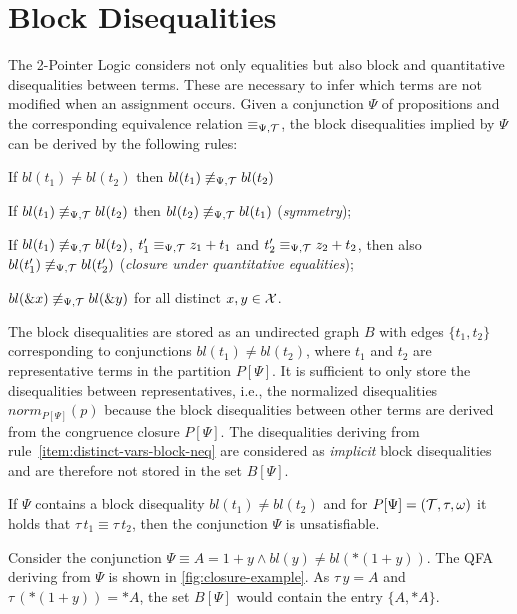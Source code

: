 \section{Block Disequalities}\label{section:block-disequalities}

The 2-Pointer Logic considers not only equalities but also block and quantitative disequalities between terms.
These are necessary to infer which terms are not
modified when an assignment occurs.
Given a conjunction $\Psi$ of propositions and the corresponding equivalence relation $\equiv_{\Psi,\mathcal{T}}$, the block disequalities implied by $\Psi$ can be derived by the following rules:\cite{new-paper-todo}

\begin{enumerate}[label={[B\arabic*]}, ref={[B\arabic*]}]
    \setcounter{enumi}{-1} %
    \item If $bl(t_1)\neq bl(t_2)$ then $bl(t_1)\not\equiv_{\Psi,\mathcal{T}} bl(t_2)$
    \item If $bl(t_1)\not\equiv_{\Psi,\mathcal{T}} bl(t_2)$ then $bl(t_2)\not\equiv_{\Psi,\mathcal{T}} bl(t_1)$
          (\emph{symmetry});
          \item\label{item:closure-under-quantitative-equalities}
          If $bl(t_1)\not\equiv_{\Psi,\mathcal{T}} bl(t_2)$, $t'_1 \equiv_{\Psi,\mathcal{T}} z_1+t_1$ and $t'_2\equiv_{\Psi,\mathcal{T}} z_2+t_2$, then
          also $bl(t'_1)\not\equiv_{\Psi,\mathcal{T}} bl(t'_2)$ (\emph{closure under quantitative equalities});
          \item\label{item:distinct-vars-block-neq} $bl(\&x) \not\equiv_{\Psi,\mathcal{T}} bl(\&y)$ for all distinct $x, y \in \mathcal{X}$.
\end{enumerate}

The block disequalities are stored as an undirected graph $B$
with edges $\{t_1,t_2\}$ corresponding to conjunctions $bl(t_1) \neq bl(t_2)$,
where $t_1$ and $t_2$ are representative terms in the partition $P[\Psi]$.
It is sufficient to only store the disequalities between representatives, i.e.,
the normalized disequalities $norm_{P[\Psi]}(p)$ because
the block disequalities between other terms are derived from the congruence closure $P[\Psi]$.
The disequalities deriving from rule~\ref{item:distinct-vars-block-neq} are considered as \emph{implicit} block disequalities and are therefore not stored in the set $B[\Psi]$.

If $\Psi$ contains a block disequality $bl(t_1) \neq bl(t_2)$ and for $P[\Psi] = (\mathcal{T}, \tau, \omega)$ it holds that
$\tau\,t_1 \equiv \tau\,t_2$, then the conjunction $\Psi$ is unsatisfiable.

\begin{example}\label{ex:bldiseq}
    Consider the conjunction $\Psi \equiv A = 1 + y \land bl(y) \neq bl(*(1 + y))$.
    The QFA deriving from $\Psi$ is shown in \cref{fig:closure-example}.
    As $\tau\,y = A$ and $\tau\,(*(1+y)) = *A$, the set $B[\Psi]$ would contain the entry $\{A,*A\}$.
\end{example}

